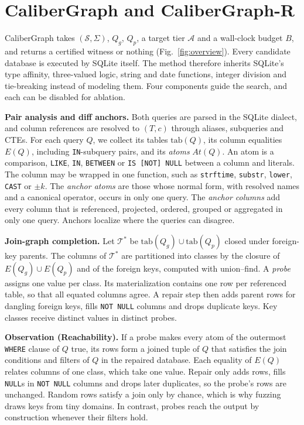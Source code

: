 \section{CaliberGraph and CaliberGraph-R}\label{sec:method}

CaliberGraph takes $(\mathcal S,\Sigma)$, $Q_g$, $Q_p$, a target tier $\mathcal A$ and a wall-clock budget $B$, and returns a certified witness or nothing (Fig.~\ref{fig:overview}). Every candidate database is executed by SQLite itself. The method therefore inherits SQLite's type affinity, three-valued logic, string and date functions, integer division and tie-breaking instead of modeling them. Four components guide the search, and each can be disabled for ablation.



\textbf{Pair analysis and diff anchors.} Both queries are parsed in the SQLite dialect, and column references are resolved to $(T,c)$ through aliases, subqueries and CTEs. For each query $Q$, we collect its tables $\mathrm{tab}(Q)$, its column equalities $E(Q)$, including \texttt{IN}-subquery pairs, and its \emph{atoms} $\mathit{At}(Q)$. An atom is a comparison, \texttt{LIKE}, \texttt{IN}, \texttt{BETWEEN} or \texttt{IS [NOT] NULL} between a column and literals. The column may be wrapped in one function, such as \texttt{strftime}, \texttt{substr}, \texttt{lower}, \texttt{CAST} or $\pm k$. The \emph{anchor atoms} are those whose normal form, with resolved names and a canonical operator, occurs in only one query. The \emph{anchor columns} add every column that is referenced, projected, ordered, grouped or aggregated in only one query. Anchors localize where the queries can disagree.

\textbf{Join-graph completion.} Let $\mathcal T^{*}$ be $\mathrm{tab}(Q_g)\cup\mathrm{tab}(Q_p)$ closed under foreign-key parents. The columns of $\mathcal T^{*}$ are partitioned into classes by the closure of $E(Q_g)\cup E(Q_p)$ and of the foreign keys, computed with union--find. A \emph{probe} assigns one value per class. Its materialization contains one row per referenced table, so that all equated columns agree. A repair step then adds parent rows for dangling foreign keys, fills \texttt{NOT NULL} columns and drops duplicate keys. Key classes receive distinct values in distinct probes.

\textbf{Observation (Reachability).} If a probe makes every atom of the outermost \texttt{WHERE} clause of $Q$ true, its rows form a joined tuple of $Q$ that satisfies the join conditions and filters of $Q$ in the repaired database. Each equality of $E(Q)$ relates columns of one class, which take one value. Repair only adds rows, fills \texttt{NULL}s in \texttt{NOT NULL} columns and drops later duplicates, so the probe's rows are unchanged. Random rows satisfy a join only by chance, which is why fuzzing draws keys from tiny domains. In contrast, probes reach the output by construction whenever their filters hold.

